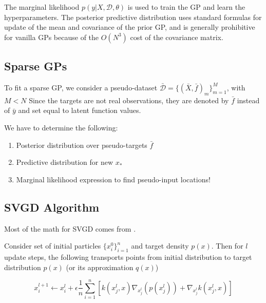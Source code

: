 \documentclass[12pt]{article}
\renewcommand{\[}{\left[}
\renewcommand{\]}{\right]}
\renewcommand{\(}{\left(}
\renewcommand{\)}{\right)}
\begin{document}
The marginal likelihood $p(y | X, \mathcal{D}, \theta)$ is used to train the GP and learn the hyperparameters. The posterior predictive distribution uses standard formulas for update of the mean and covariance of the prior GP, and is generally prohibitive for vanilla GPs because of the $O(N^3)$ cost of the covariance matrix.

\subsection{Sparse GPs}

\citep{snelson_sparse_2005} To fit a sparse GP, we consider a pseudo-dataset $\bar{\mathcal{D}} = \{(\bar{X}, \bar{f})_m\}_{m=1}^{M}$, with $M<N$ Since the targets are not real observations, they are denoted by $\bar{f}$ instead of $\bar{y}$ and set equal to latent function values.

We have to determine the following:

\begin{enumerate}
    \item Posterior distribution over pseudo-targets $\bar{f}$

    \item Predictive distribution for new $x_{\ast}$

    \item Marginal likelihood expression to find pseudo-input locations!
\end{enumerate}

\subsection{SVGD Algorithm}
Most of the math for SVGD comes from \cite{liu_short_2016,liu_kernelized_2016}.

Consider set of initial particles $\{x_i^0\}_{i=1}^n$ and target density $p(x)$. Then for $l$ update steps, the following transports points from initial distribution to target distribution $p(x)$ (or its approximation $q(x)$)

$$x_i^{l+1} \leftarrow x_i^{l} + \epsilon \frac{1}{n}\sum_{i=1}^{n}\left[k(x_j^l, x) \nabla_{x_j^l}(p(x_j^l)) + \nabla_{x_j^l}k(x_j^l, x)\right]$$


\end{document}

